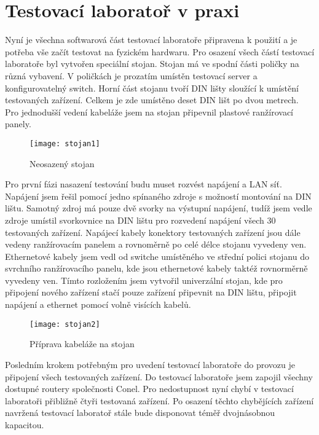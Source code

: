 \chapter{Testovací laboratoř v praxi}

Nyní je všechna softwarová část testovací laboratoře připravena k použití a je potřeba vše začít testovat na fyzickém hardwaru. Pro osazení všech částí testovací laboratoře byl vytvořen speciální stojan. Stojan má ve spodní části poličky na různá vybavení. V poličkách je prozatím umístěn testovací server a konfigurovatelný switch. Horní část stojanu tvoří DIN lišty sloužící k umístění testovaných zařízení. Celkem je zde umístěno deset DIN lišt po dvou metrech. Pro jednodušší vedení kabeláže jsem na stojan připevnil plastové ranžírovací panely.

\begin{figure}[h]
  \centering
  \texttt{[image: stojan1]}
  \caption{Neosazený stojan}
  \label{fig:stojan1}
\end{figure}

Pro první fázi nasazení testování budu muset rozvést napájení a LAN síť. Napájení jsem řešil pomocí jedno spínaného zdroje s možností montování na DIN lištu. Samotný zdroj má pouze dvě svorky na výstupní napájení, tudíž jsem vedle zdroje umístil svorkovnice na DIN lištu pro rozvedení napájení všech 30 testovaných zařízení. Napájecí kabely konektory testovaných zařízení jsou dále vedeny ranžírovacím panelem a rovnoměrně po celé délce stojanu vyvedeny ven. Ethernetové kabely jsem vedl od switche umístěného ve střední polici stojanu do svrchního ranžírovacího panelu, kde jsou ethernetové kabely taktéž rovnorměrně vyvedeny ven. Tímto rozložením jsem vytvořil univerzální stojan, kde pro připojení nového zařízení stačí pouze zařízení připevnit na DIN lištu, připojit napájení a ethernet pomocí volně visících kabelů.

\begin{figure}[h]
  \centering
  \texttt{[image: stojan2]}
  \caption{Příprava kabeláže na stojan}
  \label{fig:stojan2}
\end{figure}

Posledním krokem potřebným pro uvedení testovací laboratoře do provozu je připojení všech testovaných zařízení. Do testovací laboratoře jsem zapojil všechny dostupné routery společnosti Conel. Pro nedostupnost nyní chybí v testovací laboratoři přibližně čtyři testovaná zařízení. Po osazení těchto chybějících zařízení navržená testovací laboratoř stále bude disponovat téměř dvojnásobnou kapacitou.

